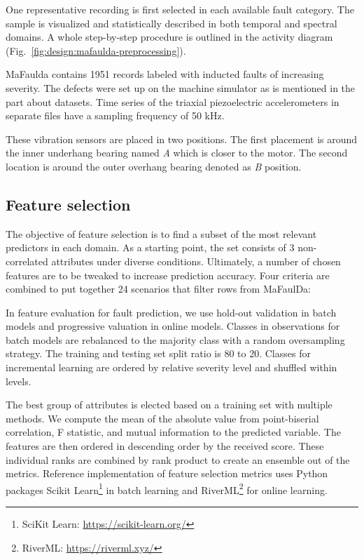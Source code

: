 One representative recording is first selected in each available fault category. The sample is visualized and statistically described in both temporal and spectral domains. A whole step-by-step procedure is outlined in the activity diagram (Fig.~\ref{fig:design:mafaulda-preprocessing}).


MaFaulda contains 1951 records labeled with inducted faults of increasing severity. The defects were set up on the machine simulator as is mentioned in the part about datasets. Time series of the triaxial piezoelectric accelerometers in separate files have a sampling frequency of 50 kHz. 

These vibration sensors are placed in two positions. The first placement is around the inner underhang bearing named \emph{A} which is closer to the motor. The second location is around the outer overhang bearing denoted as \emph{B} position.

\subsection{Feature selection}
The objective of feature selection is to find a subset of the most relevant predictors in each domain. As a starting point, the set consists of 3 non-correlated attributes under diverse conditions. Ultimately, a number of chosen features are to be tweaked to increase prediction accuracy. Four criteria are combined to put together 24 scenarios that filter rows from MaFaulDa:


In feature evaluation for fault prediction, we use hold-out validation in batch models and progressive valuation in online models. Classes in observations for batch models are rebalanced to the majority class with a random oversampling strategy. The training and testing set split ratio is 80 to 20. Classes for incremental learning are ordered by relative severity level and shuffled within levels. 

The best group of attributes is elected based on a training set with multiple methods. We compute the mean of the absolute value from point-biserial correlation, F statistic, and mutual information to the predicted variable. The features are then ordered in descending order by the received score. These individual ranks are combined by rank product to create an ensemble out of the metrics. Reference implementation of feature selection metrics uses Python packages Scikit Learn\footnote{SciKit Learn: \url{https://scikit-learn.org/}} in batch learning and RiverML\footnote{RiverML: \url{https://riverml.xyz/}} for online learning.


